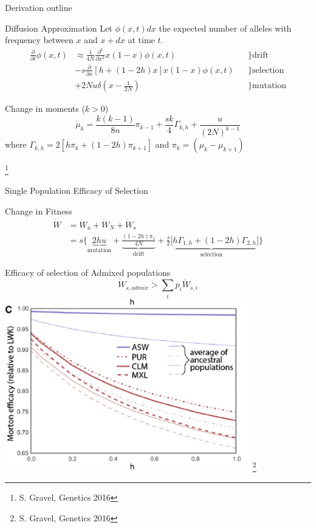 \documentclass[10pt]{beamer}
\newcommand{\del}[1]{\ensuremath{\frac{\partial}{\partial #1}}}
\newcommand{\dell}[1]{\ensuremath{\frac{\partial^2}{\partial #1^2}}}
\begin{document}
\begin{frame}{Derivation outline}
  \begin{alertblock}{Diffusion Approximation}
    Let $\phi(x,t)dx$ the expected number of alleles with frequency between $x$
    and $x + dx$ at time $t$.
    \begin{align}
      \del t \phi(x,t) & \approx \frac{1}{4N} \dell x x(1-x) \phi(x,t) 
      & &\bigg\} \mathrm{drift}
      \nonumber \\ 
      &- s \del x [h + ( 1 - 2h)x]x(1-x) \phi(x,t) 
      & &\bigg\} \mathrm{selection}
      \nonumber \\
      &+ 2Nu\delta\left(x - \frac{1}{2N}\right)
      & &\bigg\} \mathrm{mutation}
    \end{align}
  \end{alertblock}
  \begin{block}{Change in moments ($ k > 0$)}
    \[
      \dot \mu_k = \frac{k(k-1)}{8n} \pi_{k-1} + 
        \frac{sk}{4} \Gamma_{k,h} +
        \frac{u}{(2N)^{k-1}}
    \]
    where $\Gamma_{k,h} = 2[h\pi_k + (1 - 2h) \pi_{k+1}]$ and $\pi_k=(\mu_k - \mu_{k + 1})$
  \end{block}
  \let\thefootnote\relax\footnote{S. Gravel, Genetics 2016}
\end{frame}

\begin{frame}{Single Population Efficacy of Selection}
  \begin{block}{Change in Fitness}
  \begin{align}
    \dot W &= \dot W_u + \dot W_N + \dot W_s
    \nonumber \\
    &= s \big\{
    \underbrace{2hu}_\text{mutation} + 
    \underbrace{\frac{(1 - 2h)\pi_1}{4N}}_\text{drift} + 
    \underbrace{\frac{s}{2}[h\Gamma_{1,h}+(1-2h)\Gamma_{2,h}}_\text{selection}]
      \big\}
  \end{align}
  \end{block}
\end{frame}

\begin{frame}{\normalsize Efficacy of selection of Admixed populations} 
  \vfill
  \centering
  \[
    \dot W_{s,admix} > \sum_i p_i \dot W_{s,i}
  \]
  \includegraphics[width=0.8\textwidth]{./Figures/Gravel_efsel_admix.png}
  \let\thefootnote\relax\footnote{S. Gravel, Genetics 2016}
\end{frame}
\end{document}
